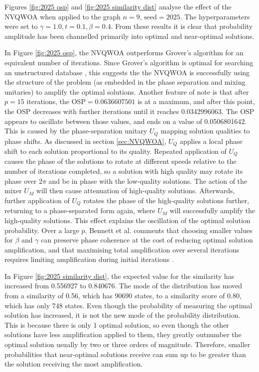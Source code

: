 Figures \ref{fig:2025 osp} and \ref{fig:2025 similarity dist} analyse the effect of the NVQWOA when applied to the graph $n=9$, $\text{seed}=2025$. The hyperparameters were set to $\gamma=1.0, t=0.1, \beta=0.4$. From these results it is clear that probability amplitude has been channelled primarily into optimal and near-optimal solutions. 

In Figure \ref{fig:2025 osp}, the NVQWOA outperforms Grover's algorithm for an equivalent number of iterations. Since Grover's algorithm is optimal for searching an unstructured database \cite{grover_optimal}, this suggests the the NVQWOA is successfully using the structure of the problem (as embedded in the phase separation and mixing unitaries) to amplify the optimal solutions. Another feature of note is that after $p=15$ iterations, the OSP$=0.0636607501$ is at a maximum, and after this point, the OSP decreases with further iterations until it reaches 0.0342996063. The OSP appears to oscillate between those values, and ends on a value of 0.0506801642. This is caused by the phase-separation unitary $U_Q$ mapping solution qualities to phase shifts. As discussed in section \ref{sec:NVQWOA}, $U_Q$ applies a local phase shift to each solution proportional to its quality. Repeated application of $U_Q$ causes the phase of the solutions to rotate at different speeds relative to the number of iterations completed, so a solution with high quality may rotate its phase over $2\pi$ and be in phase with the low-quality solutions. The action of the mixer $U_M$ will then cause attenuation of high-quality solutions. Afterwards, further application of $U_Q$ rotates the phase of the high-quality solutions further, returning to a phase-separated form again, where $U_M$ will successfully amplify the high-quality solutions. This effect explains the oscillation of the optimal solution probability. Over a large $p$, Bennett et al. comments that choosing smaller values for $\beta$ and $\gamma$ can preserve phase coherence at the cost of reducing optimal solution amplification, and that maximising total amplification over several iterations requires limiting amplification during initial iterations \cite{bennett2024analysisnonvariationalquantumwalkbased}.

In Figure \ref{fig:2025 similarity dist}, the expected value for the similarity has increased from 0.556927 to 0.840676. The mode of the distribution has moved from a similarity of 0.56, which has 90690 states, to a similarity score of 0.80, which has only 748 states. Even though the probability of measuring the optimal solution has increased, it is not the new mode of the probability distribution. This is because there is only 1 optimal solution, so even though the other solutions have less amplification applied to them, they greatly outnumber the optimal solution usually by two or three orders of magnitude. Therefore, smaller probabilities that near-optimal solutions receive can sum up to be greater than the solution receiving the most amplification.

